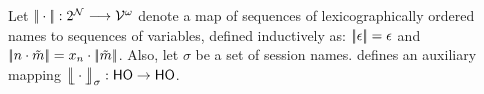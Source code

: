 \documentclass[runningheads]{llncs}
\begin{document}
{{%

%

%




\begin{definition} \label{d:trabs}\label{d:auxmap}
	Let $|\!|\cdot|\!|: 2^{\mathcal{N}} \longrightarrow \mathcal{V}^\omega$
	denote a map of sequences of lexicographically ordered names to sequences of variables, defined
	inductively 
	as: 
	$|\!|\epsilon|\!| = \epsilon$ and $|\!|n \cdot \tilde{m}|\!| = x_n \cdot |\!|\tilde{m}|\!|$. 
	Also, let $\sigma$ be a set of session names.
	 defines an auxiliary mapping
	$\big\lfloor\!\!\big\lfloor\cdot\big\rfloor\!\!\big\rfloor^{}_\sigma: \mathsf{HO} \to \mathsf{HO}$.
\end{definition}

%






}}
\end{document}
